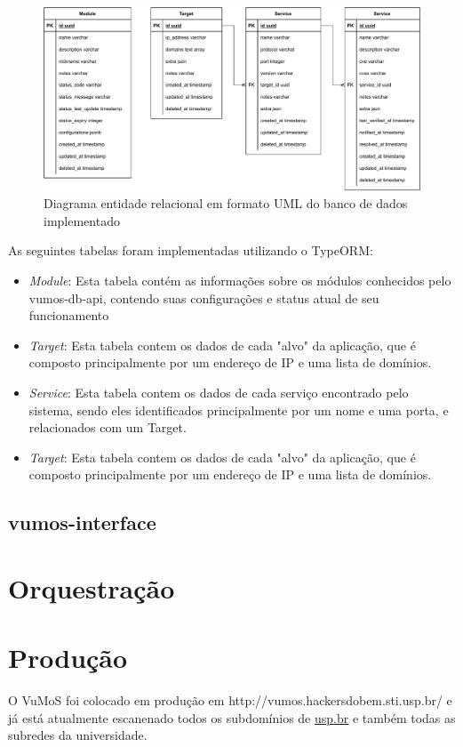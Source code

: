     \begin{figure}[H]
        \includegraphics[scale=0.7]{figuras/vumos-db-api-uml.drawio.pdf}
        \caption{Diagrama entidade relacional em formato UML do banco de dados implementado \label{fig:vumos-db-uml}}
    \end{figure}
    
    As seguintes tabelas foram implementadas utilizando o TypeORM:
    \begin{itemize}
        \item \emph{Module}: Esta tabela contém as informações sobre os módulos conhecidos pelo vumos-db-api, contendo suas configurações e status atual de seu funcionamento
        \item \emph{Target}: Esta tabela contem os dados de cada "alvo" da aplicação, que é composto principalmente por um endereço de IP e uma lista de domínios.
        \item \emph{Service}: Esta tabela contem os dados de cada serviço encontrado pelo sistema, sendo eles identificados principalmente por um nome e uma porta, e relacionados com um Target.
        \item \emph{Target}: Esta tabela contem os dados de cada "alvo" da aplicação, que é composto principalmente por um endereço de IP e uma lista de domínios.
    \end{itemize}
    
    
    \subsection{vumos-interface}
    

\section{Orquestração}
    

\section{Produção}
    O VuMoS foi colocado em produção em http://vumos.hackersdobem.sti.usp.br/ e já está atualmente escanenado todos os subdomínios de \url{usp.br} e também todas as subredes da universidade. 


